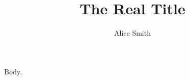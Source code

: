 \documentclass{article}
\title{The Real Title}
\author{Alice Smith}
\begin{document}
\maketitle
Body.
\end{document}
